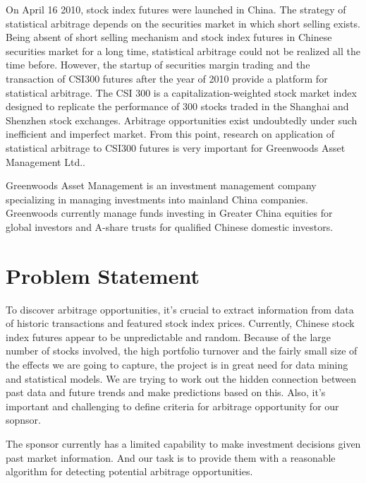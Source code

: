 \documentclass[12pt,letterpaper]{article}
\theoremstyle{definition}
\begin{document}
 \vspace{6pt}\noindent On April 16 2010, stock index futures were launched in China. The strategy of statistical arbitrage depends on the securities market in which short selling exists. Being absent of short selling mechanism and stock index futures in Chinese securities market for a long time, statistical arbitrage could not be realized all the time before. However, the startup of securities margin trading and the transaction of CSI300 futures after the year of 2010 provide a platform for statistical arbitrage. The CSI 300 is a capitalization-weighted stock market index designed to replicate the performance of 300 stocks traded in the Shanghai and Shenzhen stock exchanges. Arbitrage opportunities exist undoubtedly under such inefficient and imperfect market. From this point, research on application of statistical arbitrage to CSI300 futures is very important for Greenwoods Asset Management Ltd.. 

 \vspace{6pt}\noindent Greenwoods Asset Management is an investment management company specializing in managing investments into mainland China companies. Greenwoods currently manage funds investing in Greater China equities for global investors and A-share trusts for qualified Chinese domestic investors.


\section{Problem Statement}

To discover arbitrage opportunities, it’s crucial to extract information from data of historic transactions and featured stock index prices. Currently, Chinese stock index futures appear to be unpredictable and random. Because of the large number of stocks involved, the high portfolio turnover and the fairly small size of the effects we are going to capture, the project is in great need for data mining and statistical models. We are trying to work out the hidden connection between past data and future trends and make predictions based on this. Also, it’s important and challenging to define criteria for arbitrage opportunity for our sopnsor.

\vspace{6pt}\noindent The sponsor currently has a limited capability to make investment decisions given past market information. And our task is to provide them with a reasonable algorithm for detecting potential arbitrage opportunities.
\end{document}
